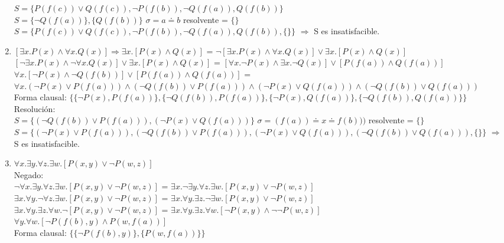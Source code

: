 \documentclass[10pt,a4paper]{article}
\begin{document}
\begin{enumerate}
    $S=\{ P(f(c)) \lor Q(f(c)), \lnot P(f(b)), \lnot Q(f(a)), Q(f(b)) \}$ \\
    $S=\{ \lnot Q(f(a))\},\{Q(f(b)) \}$ $ \sigma= a \doteq b$ resolvente = $ \{\} $
    $S=\{ P(f(c)) \lor Q(f(c)), \lnot P(f(b)), \lnot Q(f(a)), Q(f(b)), \{\} \}$ $\Rightarrow$ S es insatisfacible.
    \item
    $ [\exists x. P(x) \land \forall x. Q(x)] \Rightarrow \exists x. [P(x) \land Q(x)] $  =  $ \lnot [\exists x. P(x) \land \forall x. Q(x)] \lor \exists x. [P(x) \land Q(x)] $ \\
    $ [\lnot \exists x. P(x) \land \lnot \forall x. Q(x)] \lor \exists x. [P(x) \land Q(x)] $  =  $ [\forall x. \lnot P(x) \land \exists x. \lnot Q(x)] \lor [P(f(a)) \land Q(f(a))] $ \\
    $ \forall x. [\lnot P(x) \land \lnot Q(f(b))] \lor [P(f(a)) \land Q(f(a))] $  =  $ \forall x. (\lnot P(x) \lor P(f(a))) \land (\lnot Q(f(b)) \lor P(f(a))) \land (\lnot P(x)\lor Q(f(a))) \land (\lnot Q(f(b)) \lor Q(f(a))) $ \\
    Forma clausal: $\{ \{ \lnot P(x), P(f(a))\}, \{ \lnot Q(f(b)), P(f(a))\}, \{ \lnot P(x), Q(f(a))\}, \{ \lnot Q(f(b)), Q(f(a))\}\}$
    Resolución: \\
    $S=\{(\lnot Q(f(b)) \lor P(f(a))), (\lnot P(x)\lor Q(f(a)))\}$ $\sigma=(f(a)) \doteq x \doteq f(b)))$ resolvente = $ \{\} $ \\
    $S=\{ (\lnot P(x) \lor P(f(a))), (\lnot Q(f(b)) \lor P(f(a))), (\lnot P(x)\lor Q(f(a))), (\lnot Q(f(b)) \lor Q(f(a))), \{\}\}$ $\Rightarrow$ S es insatisfacible.
    \item
    $\forall x. \exists y. \forall z. \exists w. [P(x,y) \lor \lnot P(w,z)]$ \\
    Negado: \\
    $\lnot \forall x. \exists y. \forall z. \exists w. [P(x,y) \lor \lnot P(w,z)]$  =  $\exists x. \lnot \exists y. \forall z. \exists w. [P(x,y) \lor \lnot P(w,z)]$ \\
    $\exists x. \forall y. \lnot \forall z. \exists w. [P(x,y) \lor \lnot P(w,z)]$  =  $\exists x. \forall y. \exists z. \lnot \exists w. [P(x,y) \lor \lnot P(w,z)]$ \\
    $\exists x. \forall y. \exists z. \forall w. \lnot [P(x,y) \lor \lnot P(w,z)]$  =  $\exists x. \forall y. \exists z. \forall w. [\lnot P(x,y) \land \lnot \lnot P(w,z)]$ \\
    $\forall y. \forall w. [\lnot P(f(b),y) \land P(w,f(a))]$ \\
    Forma clausal: $\{\{ \lnot P(f(b),y) \}, \{P(w,f(a)) \} \}$

\end{enumerate}
\end{document}
